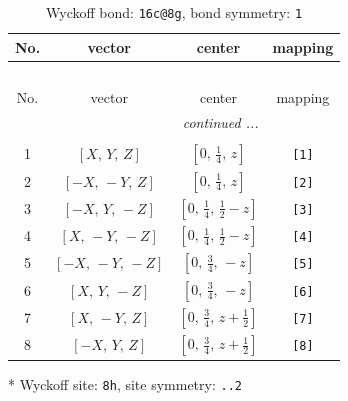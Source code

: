 \documentclass[fleqn,8pt]{jsarticle}
\begin{document}
\renewcommand{\arraystretch}{1.2}
\begin{longtable}{cccc}
\caption{Wyckoff bond: {\tt 16c@8g}, bond symmetry: {\tt 1}}
 \\
 \hline \hline
No. & vector & center & mapping \\ \hline \endfirsthead

\multicolumn{3}{l}{\tablename\ \thetable{}} \\
 \hline \hline
No. & vector & center & mapping \\ \hline \endhead

 \hline \hline
\multicolumn{3}{r}{\footnotesize\it continued ...} \\ \endfoot

 \hline \hline
\multicolumn{3}{r}{} \\ \endlastfoot

1 & $\left[ X,\, Y,\, Z \right]$ & $\left[ 0,\, \frac{1}{4},\, z \right]$ & {\tt [1]} \\ \hline
2 & $\left[ - X,\, - Y,\, Z \right]$ & $\left[ 0,\, \frac{1}{4},\, z \right]$ & {\tt [2]} \\ \hline
3 & $\left[ - X,\, Y,\, - Z \right]$ & $\left[ 0,\, \frac{1}{4},\, \frac{1}{2} - z \right]$ & {\tt [3]} \\ \hline
4 & $\left[ X,\, - Y,\, - Z \right]$ & $\left[ 0,\, \frac{1}{4},\, \frac{1}{2} - z \right]$ & {\tt [4]} \\ \hline
5 & $\left[ - X,\, - Y,\, - Z \right]$ & $\left[ 0,\, \frac{3}{4},\, - z \right]$ & {\tt [5]} \\ \hline
6 & $\left[ X,\, Y,\, - Z \right]$ & $\left[ 0,\, \frac{3}{4},\, - z \right]$ & {\tt [6]} \\ \hline
7 & $\left[ X,\, - Y,\, Z \right]$ & $\left[ 0,\, \frac{3}{4},\, z + \frac{1}{2} \right]$ & {\tt [7]} \\ \hline
8 & $\left[ - X,\, Y,\, Z \right]$ & $\left[ 0,\, \frac{3}{4},\, z + \frac{1}{2} \right]$ & {\tt [8]} \\
\end{longtable}
* Wyckoff site: {\tt 8h}, site symmetry: {\tt ..2}
\renewcommand{\arraystretch}{1.2}
\end{document}

